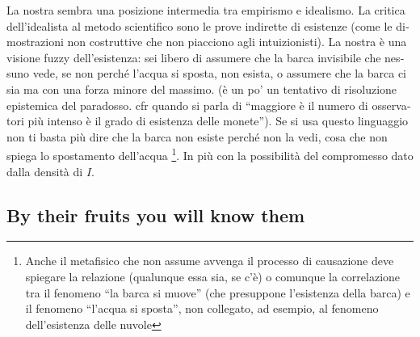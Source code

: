 \begin{italian}

La nostra sembra una posizione intermedia tra empirismo e idealismo. La critica dell'idealista al metodo scientifico sono le prove indirette di esistenze (come le dimostrazioni non costruttive che non piacciono agli intuizionisti). La nostra è una visione fuzzy dell'esistenza: sei libero di assumere che la barca invisibile che nessuno vede, se non perché l'acqua si sposta, non esista, o assumere che la barca ci sia ma con una forza minore del massimo. (è un po' un tentativo di risoluzione epistemica del paradosso. cfr quando si parla di ``maggiore è il numero di osservatori più intenso è il grado di esistenza delle monete''). Se si usa questo linguaggio non ti basta più dire che la barca non esiste perché non la vedi, cosa che non spiega lo spostamento dell'acqua \footnote{Anche il metafisico che non assume avvenga il processo di causazione deve spiegare la relazione (qualunque essa sia, se c'è) o comunque la correlazione tra il fenomeno ``la barca si muove'' (che presuppone l'esistenza della barca) e il fenomeno ``l'acqua si sposta'', non collegato, ad esempio, al fenomeno dell'esistenza delle nuvole}. In più con la possibilità del compromesso dato dalla densità di $I$.
\end{italian}

\subsection{By their fruits you will know them}\label{frutti}


